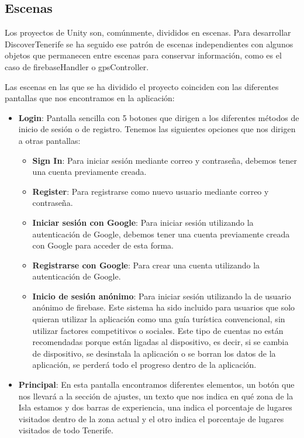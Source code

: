 \subsection{Escenas}
Los proyectos de Unity son, comúnmente, divididos en escenas. Para desarrollar DiscoverTenerife se ha seguido ese patrón de escenas independientes con algunos objetos que permanecen entre escenas para conservar información, como es el caso de firebaseHandler o gpsController. 

Las escenas en las que se ha dividido el proyecto coinciden con las diferentes pantallas que nos encontramos en la aplicación:

\begin{itemize}
\item \textbf{Login}: Pantalla sencilla con 5 botones que dirigen a los diferentes métodos de inicio de sesión o de registro. Tenemos las siguientes opciones que nos dirigen a otras pantallas: 
\begin{itemize}
    \item \textbf{Sign In}: Para iniciar sesión mediante correo y contraseña, debemos tener una cuenta previamente creada.
    
    \item \textbf{Register}: Para registrarse como nuevo usuario mediante correo y contraseña.
    
    \item \textbf{Iniciar sesión con Google}: Para iniciar sesión utilizando la autenticación de Google, debemos tener una cuenta previamente creada con Google para acceder de esta forma.
    
    \item \textbf{Registrarse con Google}: Para crear una cuenta utilizando la autenticación de Google.
    
    \item \textbf{Inicio de sesión anónimo}: Para iniciar sesión utilizando la de usuario anónimo de firebase. Este sistema ha sido incluido para usuarios que solo quieran utilizar la aplicación como una guía turística convencional, sin utilizar factores competitivos o sociales. Este tipo de cuentas no están recomendadas porque están ligadas al dispositivo, es decir, si se cambia de dispositivo, se desinstala la aplicación o se borran los datos de la aplicación, se perderá todo el progreso dentro de la aplicación.
\end{itemize}

\item \textbf{Principal}: En esta pantalla encontramos diferentes elementos, un botón que nos llevará a la sección de ajustes, un texto que nos indica en qué zona de la Isla estamos y dos barras de experiencia, una indica el porcentaje de lugares visitados dentro de la zona actual y el otro indica el porcentaje de lugares visitados de todo Tenerife.


\end{itemize}
